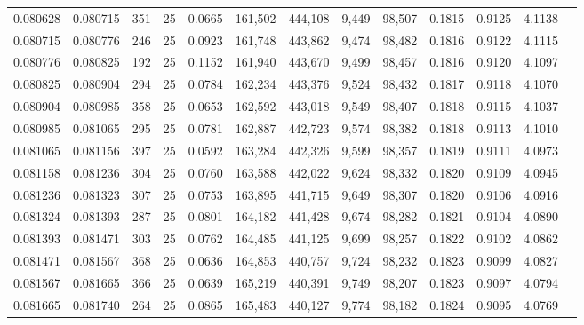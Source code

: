 \begin{tabular}{rrrrrrrrrrrrr}
0.080628 & 0.080715 &   351 &  25 &                                     0.0665 & 161,502 & 444,108 &   9,449 &  98,507 & 0.1815 & 0.9125 & 4.1138 \\
0.080715 & 0.080776 &   246 &  25 &                                     0.0923 & 161,748 & 443,862 &   9,474 &  98,482 & 0.1816 & 0.9122 & 4.1115 \\
0.080776 & 0.080825 &   192 &  25 &                                     0.1152 & 161,940 & 443,670 &   9,499 &  98,457 & 0.1816 & 0.9120 & 4.1097 \\
0.080825 & 0.080904 &   294 &  25 &                                     0.0784 & 162,234 & 443,376 &   9,524 &  98,432 & 0.1817 & 0.9118 & 4.1070 \\
0.080904 & 0.080985 &   358 &  25 &                                     0.0653 & 162,592 & 443,018 &   9,549 &  98,407 & 0.1818 & 0.9115 & 4.1037 \\
0.080985 & 0.081065 &   295 &  25 &                                     0.0781 & 162,887 & 442,723 &   9,574 &  98,382 & 0.1818 & 0.9113 & 4.1010 \\
0.081065 & 0.081156 &   397 &  25 &                                     0.0592 & 163,284 & 442,326 &   9,599 &  98,357 & 0.1819 & 0.9111 & 4.0973 \\
0.081158 & 0.081236 &   304 &  25 &                                     0.0760 & 163,588 & 442,022 &   9,624 &  98,332 & 0.1820 & 0.9109 & 4.0945 \\
0.081236 & 0.081323 &   307 &  25 &                                     0.0753 & 163,895 & 441,715 &   9,649 &  98,307 & 0.1820 & 0.9106 & 4.0916 \\
0.081324 & 0.081393 &   287 &  25 &                                     0.0801 & 164,182 & 441,428 &   9,674 &  98,282 & 0.1821 & 0.9104 & 4.0890 \\
0.081393 & 0.081471 &   303 &  25 &                                     0.0762 & 164,485 & 441,125 &   9,699 &  98,257 & 0.1822 & 0.9102 & 4.0862 \\
0.081471 & 0.081567 &   368 &  25 &                                     0.0636 & 164,853 & 440,757 &   9,724 &  98,232 & 0.1823 & 0.9099 & 4.0827 \\
0.081567 & 0.081665 &   366 &  25 &                                     0.0639 & 165,219 & 440,391 &   9,749 &  98,207 & 0.1823 & 0.9097 & 4.0794 \\
0.081665 & 0.081740 &   264 &  25 &                                     0.0865 & 165,483 & 440,127 &   9,774 &  98,182 & 0.1824 & 0.9095 & 4.0769 \\

\end{tabular}
